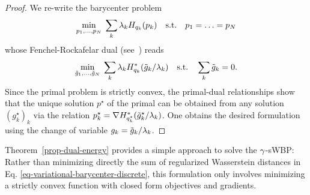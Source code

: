 \begin{proof}
	We re-write the barycenter problem 
	$$\underset{p_1,\ldots,p_N}{\min}\; \sum_k \lambda_k H_{q_k}(p_k) \quad\text{s.t.}\quad p_1=\ldots=p_N$$
	whose Fenchel-Rockafelar dual (see~\cite{rockafellar1996convex}) reads
		$$\underset{\tilde g_1,\ldots,\tilde g_N}{\min}\; \sum_k \lambda_k H_{q_k}^*(\tilde g_k/\lambda_k) 
		\quad\text{s.t.}\quad \sum_k \tilde g_k = 0.$$
	Since the primal problem is strictly convex, the primal-dual relationships show that the unique solution $p^\star$ of the primal can be obtained from any solution $(g_k^\star)_k$ via the relation
	$p_k^\star = \nabla H_{q_k^\star}^*(\tilde g_k^\star/\lambda_k)$.
	One obtains the desired formulation using the change of variable $g_k = \tilde g_k/\lambda_k$.
\end{proof}

Theorem~\ref{prop-dual-energy} provides a simple approach to solve the $\gamma$-sWBP: Rather than minimizing directly the sum of regularized Wasserstein distances in Eq. \eqref{eq-variational-barycenter-discrete}, this formulation only involves minimizing a strictly convex function with closed form objectives and gradients. 


